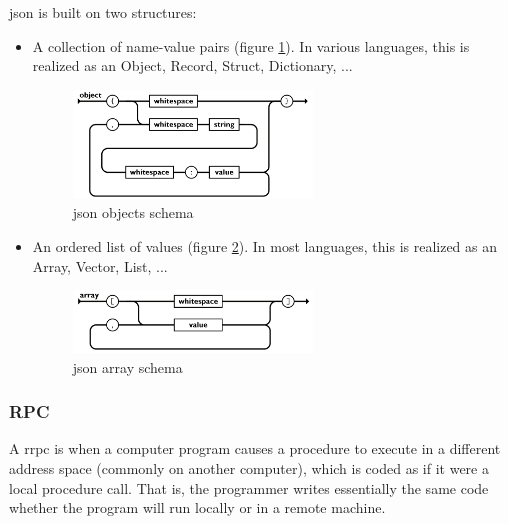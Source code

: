 \documentclass[a4paper, 12pt]{article} %
\begin{document}
            \acrshort{json} is built on two structures\cite{jsonSchema}:
            \begin{itemize}
                \item A collection of name-value pairs (figure \ref{fig:json_objects}). In various languages, this is realized as an Object, Record, Struct, Dictionary, ...
                \begin{figure}[h]
                    \centering
                    \includegraphics[width=0.6\textwidth]{json-objects.png}
                    \caption{\acrshort{json} objects schema}
                    \label{fig:json_objects}
                \end{figure}
                \item An ordered list of values (figure \ref{fig:json_arrays}). In most languages, this is realized as an Array, Vector, List, ...
                \begin{figure}[h]
                    \centering
                    \includegraphics[width=0.6\textwidth]{json-arrays.png}
                    \caption{\acrshort{json} array schema}
                    \label{fig:json_arrays}
                \end{figure}
            \end{itemize}

        \subsubsection{RPC}
            A r\acrfull{rpc}\cite{rpc} is when a computer program causes a procedure to execute in a different address space (commonly on another computer), which is coded as if it were a local procedure call. That is, the programmer writes essentially the same code whether the program will run locally or in a remote machine.\\
            
\end{document}
